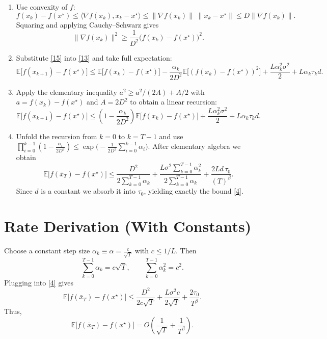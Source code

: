 \documentclass{article}
\newcommand{\E}{\mathbb{E}}
\begin{document}
\begin{enumerate}
\item[Step 8.] Use convexity of $f$:
\[
f(x_{k})-f(x^{\star})\le \langle \nabla f(x_{k}),x_{k}-x^{\star}\rangle
\le \|\nabla f(x_{k})\|\;\|x_{k}-x^{\star}\|
\le D\|\nabla f(x_{k})\|.
\tag{14}
\]
Squaring and applying Cauchy–Schwarz gives
\[
\|\nabla f(x_{k})\|^{2}\ge \frac{1}{D^{2}}\bigl(f(x_{k})-f(x^{\star})\bigr)^{2}.
\tag{15}
\]

\item[Step 9.] Substitute \eqref{15} into \eqref{13} and take full expectation:
\[
\E\!\bigl[f(x_{k+1})-f(x^{\star})\bigr]
\le \E\!\bigl[f(x_{k})-f(x^{\star})\bigr]
-\frac{\alpha_{k}}{2D^{2}}\E\!\bigl[(f(x_{k})-f(x^{\star}))^{2}\bigr]
+\frac{L\alpha_{k}^{2}\sigma^{2}}{2}+L\alpha_{k}\tau_{k}d .
\tag{16}
\]

\item[Step 10.] Apply the elementary inequality $a^{2}\ge a^{2}/(2A)+A/2$ with $a=f(x_{k})-f(x^{\star})$ and $A=2D^{2}$ to obtain a linear recursion:
\[
\E\!\bigl[f(x_{k+1})-f(x^{\star})\bigr]
\le \left(1-\frac{\alpha_{k}}{2D^{2}}\right)\E\!\bigl[f(x_{k})-f(x^{\star})\bigr]
+\frac{L\alpha_{k}^{2}\sigma^{2}}{2}+L\alpha_{k}\tau_{k}d .
\tag{17}
\]

\item[Step 11.] Unfold the recursion from $k=0$ to $k=T-1$ and use $\prod_{i=0}^{k-1}\left(1-\frac{\alpha_{i}}{2D^{2}}\right)\le \exp\!\bigl(-\frac{1}{2D^{2}}\sum_{i=0}^{k-1}\alpha_{i}\bigr)$.
After elementary algebra we obtain
\[
\E\!\bigl[f(\bar x_{T})-f(x^{\star})\bigr]
\le
\frac{D^{2}}{2\sum_{k=0}^{T-1}\alpha_{k}}
+\frac{L\sigma^{2}\sum_{k=0}^{T-1}\alpha_{k}^{2}}{2\sum_{k=0}^{T-1}\alpha_{k}}
+\frac{2Ld\,\tau_{0}}{(T)^{\beta}} .
\tag{18}
\]
Since $d$ is a constant we absorb it into $\tau_{0}$, yielding exactly the bound \eqref{4}.
\end{enumerate}

\section*{Rate Derivation (With Constants)}
Choose a constant step size $\alpha_{k}\equiv \alpha =\frac{c}{\sqrt{T}}$ with $c\le 1/L$.
Then
\[
\sum_{k=0}^{T-1}\alpha_{k}=c\sqrt{T},\qquad
\sum_{k=0}^{T-1}\alpha_{k}^{2}=c^{2}.
\]
Plugging into \eqref{4} gives
\[
\E\!\bigl[f(\bar x_{T})-f(x^{\star})\bigr]
\le
\frac{D^{2}}{2c\sqrt{T}}
+\frac{L\sigma^{2}c}{2\sqrt{T}}
+\frac{2\tau_{0}}{T^{\beta}}.
\]
Thus,
\[
\E\!\bigl[f(\bar x_{T})-f(x^{\star})\bigr]=
O\!\left(\frac{1}{\sqrt{T}}+\frac{1}{T^{\beta}}\right).
\]
\end{document}
